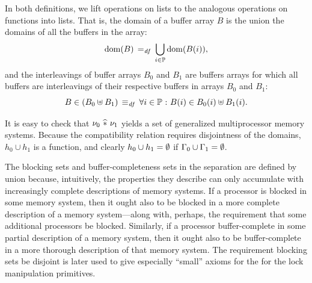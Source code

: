 \documentclass[11pt]{report}
\begin{document}
In both definitions, we lift operations on lists to the analogous operations on functions into lists. That is, the domain of a buffer array $B$ is the union the domains of all the buffers in the array:  \[ \operatorname{\mathrm{dom}}(B) \operatorname{\;=_{\mathit{df}}\;} \bigcup_{i \in \mathbb{P}} \operatorname{\mathrm{dom}}(B(i)),\] and the interleavings of buffer arrays $B_0$ and $B_1$ are buffers arrays for which all buffers are interleavings of their respective buffers in arrays $B_0$ and $B_1$: \[ B \in (B_0 \uplus B_1) \operatorname{\;\equiv_{\mathit{df}}\;} \forall i \in \mathbb{P} \operatorname{\,:\,} B(i) \in B_0(i) \uplus B_1(i).\]

It is easy to check that $\nu_0 \operatorname{\,\widehat{\ast}\,} \nu_1$ yields a set of generalized multiprocessor memory systems. Because the compatibility relation requires disjointness of the domains, $h_0 \cup h_1$ is a function, and clearly $h_0 \cup h_1 = \operatorname{\emptyset}$ if $\Gamma_0 \cup \Gamma_1 = \operatorname{\emptyset}$. 

The blocking sets and buffer-completeness sets in the separation are defined by union because, intuitively, the properties they describe can only accumulate with increasingly complete descriptions of memory systems. If a processor is blocked in some memory system, then it ought also to be blocked in a more complete description of a memory system---along with, perhaps, the requirement that some additional processors be blocked. Similarly, if a processor buffer-complete in some partial description of a memory system, then it ought also to be buffer-complete in a more thorough description of that memory system. The requirement blocking sets be disjoint is later used to give especially ``small'' axioms for the for the lock manipulation primitives. 
\end{document}
